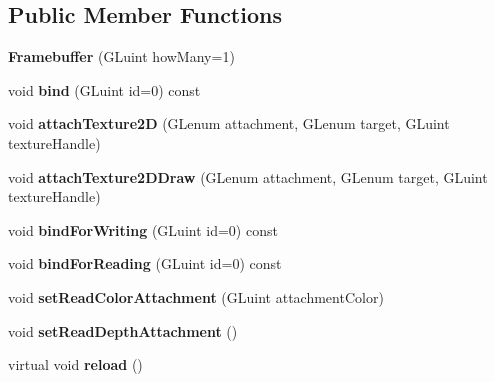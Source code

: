 \subsection*{Public Member Functions}
\begin{DoxyCompactItemize}
\item 
\mbox{\label{classflw_1_1flc_1_1Framebuffer_a26f65451d5e89e0fedd6e561e4d52cff}} 
{\bfseries Framebuffer} (G\+Luint how\+Many=1)
\item 
\mbox{\label{classflw_1_1flc_1_1Framebuffer_a38fe5a9625b1af44083931f8bee41a67}} 
void {\bfseries bind} (G\+Luint id=0) const
\item 
\mbox{\label{classflw_1_1flc_1_1Framebuffer_a1bc551a6f679db926250460486ed591f}} 
void {\bfseries attach\+Texture2D} (G\+Lenum attachment, G\+Lenum target, G\+Luint texture\+Handle)
\item 
\mbox{\label{classflw_1_1flc_1_1Framebuffer_a20cfb02c1ff5841c1a90e58b8fdb1cf1}} 
void {\bfseries attach\+Texture2\+D\+Draw} (G\+Lenum attachment, G\+Lenum target, G\+Luint texture\+Handle)
\item 
\mbox{\label{classflw_1_1flc_1_1Framebuffer_a86c62fb48ced666f0725f77fbb77c280}} 
void {\bfseries bind\+For\+Writing} (G\+Luint id=0) const
\item 
\mbox{\label{classflw_1_1flc_1_1Framebuffer_a8696d80107cb7cfcaba81066bf085eea}} 
void {\bfseries bind\+For\+Reading} (G\+Luint id=0) const
\item 
\mbox{\label{classflw_1_1flc_1_1Framebuffer_a6c4f090bf34b3d50bc6ba3bd642f4448}} 
void {\bfseries set\+Read\+Color\+Attachment} (G\+Luint attachment\+Color)
\item 
\mbox{\label{classflw_1_1flc_1_1Framebuffer_a4c407fdc426e9be189457eb20c6a1f70}} 
void {\bfseries set\+Read\+Depth\+Attachment} ()
\item 
\mbox{\label{classflw_1_1flc_1_1Framebuffer_a1ebc408b16d41bb783768d152b9bf939}} 
virtual void {\bfseries reload} ()
\end{DoxyCompactItemize}
